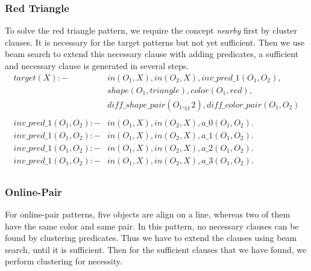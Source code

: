 \documentclass[
]{ceurart}
\begin{document}
\subsubsection{Red Triangle}
To solve the red triangle pattern, we require the concept \textit{nearby} first by cluster clauses. It is necessary for the target patterns but not yet sufficient. Then we use beam search to extend this necessary clause with adding predicates, a sufficient and necessary clause is generated in several steps.
\begin{align*}
	target(X) :- & in(O_1,X),in(O_2,X), inv\_pred\_1(O_1,O_2), \\
						& shape(O_1, triangle), color(O_1, red), \\
						& diff\_shape\_pair(O_1,_O2), diff\_color\_pair(O_1,O_2)\\
	\\
	inv\_pred\_1(O_1, O_2) :- 	& in(O_1,X), in(O_2,X), a\_0(O_1,O_2).\\
	inv\_pred\_1(O_1, O_2) :- 	& in(O_1,X), in(O_2,X), a\_1(O_1,O_2).\\		
	inv\_pred\_1(O_1, O_2) :- 	& in(O_1,X), in(O_2,X), a\_2(O_1,O_2).\\																
	inv\_pred\_1(O_1, O_2) :- 	& in(O_1,X), in(O_2,X), a\_3(O_1,O_2).\\									
\end{align*}

\subsubsection{Online-Pair}
For online-pair patterns, five objects are align on a line, whereas two of them have the same color and same pair. 
In this pattern, no necessary clauses can be found  by clustering predicates. Thus we have to extend the clauses using beam search, until it is sufficient. Then for the sufficient clauses that we have found, we perform clustering for necessity.
\end{document}
